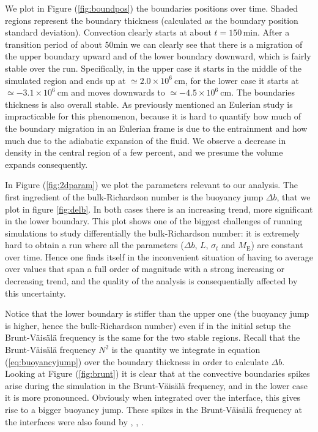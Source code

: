 We plot in Figure (\ref{fig:boundpos}) the boundaries positions over time. Shaded regions represent the boundary thickness (calculated as the boundary position standard deviation). Convection clearly starts at about $t=150 \, \mathrm{min}$. After a transition period of about $50 \mathrm{min}$ we can clearly see that there is a migration of the upper boundary upward and of the lower boundary downward, which is fairly stable over the run. Specifically, in the upper case it starts in the middle of the simulated region and ends up at $\simeq 2.0 \times 10^{6} \ \mathrm{cm}$, for the lower case it starts at $\simeq - 3.1 \times 10^{6} \ \mathrm{cm}$ and moves downwards to $\simeq - 4.5 \times 10^{6} \ \mathrm{cm}$. The boundaries thickness is also overall stable. As previously mentioned an Eulerian study is impracticable for this phenomenon, because it is hard to quantify how much of the boundary migration in an Eulerian frame is due to the entrainment and how much due to the adiabatic expansion of the fluid. We observe a decrease in density in the central region of a few percent, and we presume the volume expands consequently. 

In Figure (\ref{fig:2dparam}) we plot the parameters relevant to our analysis. 
The first ingredient of the bulk-Richardson number is the buoyancy jump $\Delta b$, that we plot in figure \ref{fig:delb}. In both cases there is an increasing trend, more significant in the lower boundary. This plot shows one of the biggest challenges of running simulations to study differentially the bulk-Richardson number: it is extremely hard to obtain a run where all the parameters ($\Delta b$, $L$, $\sigma_t$ and $M_{\mathrm{E}}$) are constant over time. Hence one finds itself in the inconvenient situation of having to average over values that span a full order of magnitude with a strong increasing or decreasing trend, and the quality of the analysis is consequentially affected by this uncertainty. 

Notice that the lower boundary is stiffer than the upper one (the buoyancy jump is higher, hence the bulk-Richardson number) even if in the initial setup the Brunt-Väisälä frequency is the same for the two stable regions. Recall that the Brunt-Väisälä frequency $N^2$ is the quantity we integrate in equation (\ref{eq:buoyancyjump}) over the boundary thickness in order to calculate $\Delta b$. Looking at Figure (\ref{fig:brunt}) it is clear that at the convective boundaries spikes arise during the simulation in the Brunt-Väisälä frequency, and in the lower case it is more pronounced. Obviously when integrated over the interface, this gives rise to a bigger buoyancy jump. These spikes in the Brunt-Väisälä frequency at the interfaces were also found by \citet{viallet2013}, \citet{arnett2015}, \citet{cristini}.

